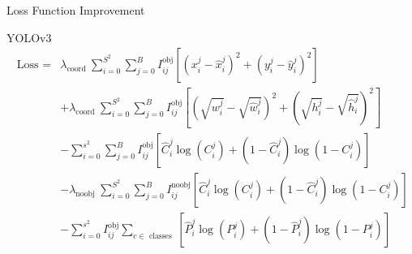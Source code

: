 \begin{frame}{Loss Function Improvement}
	\begin{block}{YOLOv3}
		\begin{equation}
			\begin{aligned}
				\text { Loss }= & \lambda_{\text {coord }} \sum_{i=0}^{S^2} \sum_{j=0}^B I_{i j}^{\mathrm{obj}}\left[\left(x_i^j-\hat{x}_i^j\right)^2+\left(y_i^j-\hat{y}_i^j\right)^2\right] \\
				& +\lambda_{\text {coord }} \sum_{i=0}^{S^2} \sum_{j=0}^B I_{i j}^{\mathrm{obj}}\left[\left(\sqrt{w_i^j}-\sqrt{\hat{w}_i^j}\right)^2+\left(\sqrt{h_i^j}-\sqrt{\hat{h}_i^j}\right)^2\right] \\
				& -\sum_{i=0}^{s^2} \sum_{j=0}^B I_{i j}^{\mathrm{obj}}\left[\hat{C}_i^j \log \left(C_i^j\right)+\left(1-\hat{C}_i^j\right) \log \left(1-C_i^j\right)\right] \\
				& -\lambda_{\text {noobj }} \sum_{i=0}^{S^2} \sum_{j=0}^B I_{i j}^{\mathrm{noobj}}\left[\hat{C}_i^j \log \left(C_i^j\right)+\left(1-\hat{C}_i^j\right) \log \left(1-C_i^j\right)\right] \\
				& -\sum_{i=0}^{s^2} I_{i j}^{\mathrm{obj}} \sum_{c \in \text { classes }}\left[\hat{P}_i^j \log \left(P_i^j\right)+\left(1-\hat{P}_i^j\right) \log \left(1-P_i^j\right)\right]
			\end{aligned}
		\end{equation}
	\end{block}
\end{frame}

